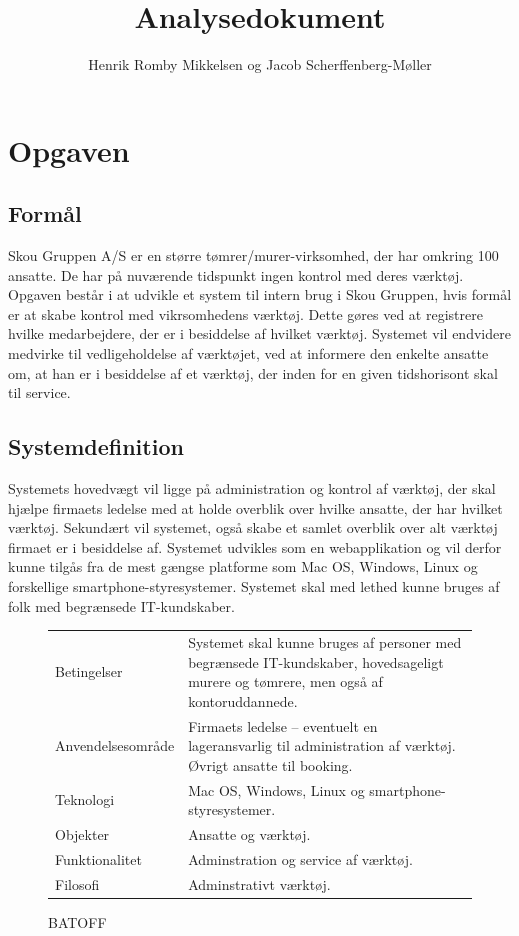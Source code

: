 \documentclass{article}
\title{Analysedokument}
\author{Henrik Romby Mikkelsen og Jacob Scherffenberg-Møller}
\begin{document}
\maketitle
\tableofcontents
\pagebreak

\section{Opgaven}

\subsection{Formål}

Skou Gruppen A/S er en større tømrer/murer-virksomhed, der har omkring 100 ansatte. De har på nuværende tidspunkt ingen kontrol med deres værktøj. Opgaven består i at udvikle et system til intern brug i Skou Gruppen, hvis formål er at skabe kontrol med vikrsomhedens værktøj. Dette gøres ved at registrere hvilke medarbejdere, der er i besiddelse af hvilket værktøj. Systemet vil endvidere medvirke til vedligeholdelse af værktøjet, ved at informere den enkelte ansatte om, at han er i besiddelse af et værktøj, der inden for en given tidshorisont skal til service.

\subsection{Systemdefinition}

Systemets hovedvægt vil ligge på administration og kontrol af værktøj, der skal hjælpe firmaets ledelse med at holde overblik over hvilke ansatte, der har hvilket værktøj. Sekundært vil systemet, også skabe et samlet overblik over alt værktøj firmaet er i besiddelse af. Systemet udvikles som en webapplikation og vil derfor kunne tilgås fra de mest gængse platforme som Mac OS, Windows, Linux og forskellige smartphone-styresystemer. Systemet skal med lethed kunne bruges af folk med begrænsede IT-kundskaber.

\begin{figure}[htbp]
\begin{tabular}{ l p{8cm} }
\hline
Betingelser & Systemet skal kunne bruges af personer med begrænsede IT-kundskaber, hovedsageligt murere og tømrere, men også af kontoruddannede. \\
Anvendelsesområde & Firmaets ledelse -- eventuelt en lageransvarlig til administration af værktøj. Øvrigt ansatte til booking.  \\
Teknologi & Mac OS, Windows, Linux og smartphone-styresystemer. \\
Objekter & Ansatte og værktøj. \\
Funktionalitet & Adminstration og service af værktøj.  \\
Filosofi & Adminstrativt værktøj. \\
\hline
\end{tabular}
\caption{BATOFF}
\end{figure}
\end{document}

